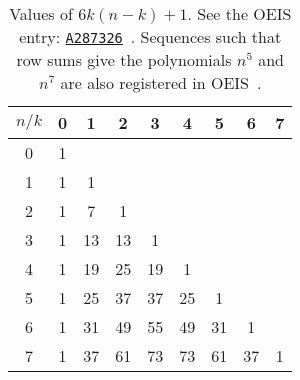\begin{table}[H]
    \setlength\extrarowheight{-6pt}
    \begin{tabular}{c|cccccccc}
        $n/k$ & 0 & 1  & 2  & 3  & 4  & 5  & 6  & 7 \\
        \hline
        0     & 1 &    &    &    &    &    &    &   \\
        1     & 1 & 1  &    &    &    &    &    &   \\
        2     & 1 & 7  & 1  &    &    &    &    &   \\
        3     & 1 & 13 & 13 & 1  &    &    &    &   \\
        4     & 1 & 19 & 25 & 19 & 1  &    &    &   \\
        5     & 1 & 25 & 37 & 37 & 25 & 1  &    &   \\
        6     & 1 & 31 & 49 & 55 & 49 & 31 & 1  &   \\
        7     & 1 & 37 & 61 & 73 & 73 & 61 & 37 & 1
    \end{tabular}
    \caption{Values of $6k(n-k) + 1$.
    See the OEIS entry: \href{https://oeis.org/A287326}{\texttt{A287326}}~\cite{kolosov2017third}.
    Sequences such that row sums give the polynomials $n^{5}$ and $n^7$
        are also registered in OEIS~\cite{kolosov2018fifth, kolosov2018seventh}.}
    \label{tab:fig_1}
\end{table}

